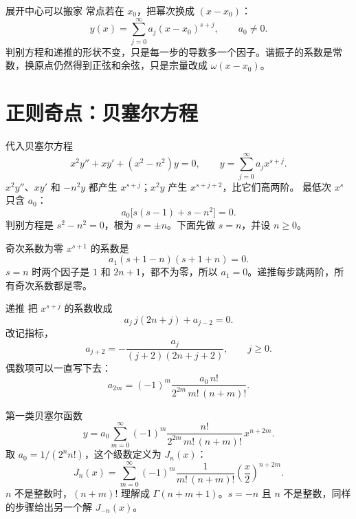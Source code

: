 \documentclass[fontset=windows, chinese, 10pt, xcolor=dvipsnames]{beamer}
\begin{document}
\begin{frame}{展开中心可以搬家}
  常点若在 $x_0$，把幂次换成 $(x-x_0)$：
  \begin{equation*}
    y(x)=\sum_{j=0}^{\infty}a_j(x-x_0)^{s+j},\qquad a_0\neq 0.
  \end{equation*}
  判别方程和递推的形状不变，只是每一步的导数多一个因子。谐振子的系数是常数，换原点仍然得到正弦和余弦，只是宗量改成 $\omega(x-x_0)$。
\end{frame}

\section{正则奇点：贝塞尔方程}

\begin{frame}{代入贝塞尔方程}
  \[
    x^2 y''+x y'+(x^2-n^2)y=0,
    \qquad
    y=\sum_{j=0}^{\infty}a_j x^{s+j}.
  \]
  $x^2 y''$、$x y'$ 和 $-n^2 y$ 都产生 $x^{s+j}$；$x^2 y$ 产生 $x^{s+j+2}$，比它们高两阶。
  \vspace{0.3em}
  最低次 $x^s$ 只含 $a_0$：
  \[
    a_0\bigl[s(s-1)+s-n^2\bigr]=0.
  \]
  判别方程是 $s^2-n^2=0$，根为 $s=\pm n$。下面先做 $s=n$，并设 $n\geq 0$。
\end{frame}

\begin{frame}{奇次系数为零}
  $x^{s+1}$ 的系数是
  \[
    a_1(s+1-n)(s+1+n)=0.
  \]
  $s=n$ 时两个因子是 $1$ 和 $2n+1$，都不为零，所以 $a_1=0$。递推每步跳两阶，所有奇次系数都是零。
\end{frame}

\begin{frame}{递推}
  把 $x^{s+j}$ 的系数收成
  \[
    a_j\,j(2n+j)+a_{j-2}=0.
  \]
  改记指标，
  \begin{equation*}
    \boxed{\displaystyle
      a_{j+2}=-\frac{a_j}{(j+2)(2n+j+2)},
      \qquad j\geq 0.}
  \end{equation*}
  偶数项可以一直写下去：
  \[
    a_{2m}=(-1)^m\frac{a_0\,n!}{2^{2m}\,m!\,(n+m)!}.
  \]
\end{frame}

\begin{frame}{第一类贝塞尔函数}
  \[
    y=a_0\sum_{m=0}^{\infty}(-1)^m
      \frac{n!}{2^{2m}\,m!\,(n+m)!}\,x^{n+2m}.
  \]
  取 $a_0=1/(2^n n!)$，这个级数定义为 $J_n(x)$：
  \begin{equation*}
    \boxed{\displaystyle
      J_n(x)
      =\sum_{m=0}^{\infty}(-1)^m
        \frac{1}{m!\,(n+m)!}
        \left(\frac{x}{2}\right)^{n+2m}.}
  \end{equation*}
  $n$ 不是整数时，$(n+m)!$ 理解成 $\Gamma(n+m+1)$。$s=-n$ 且 $n$ 不是整数，同样的步骤给出另一个解 $J_{-n}(x)$。
\end{frame}
\end{document}
